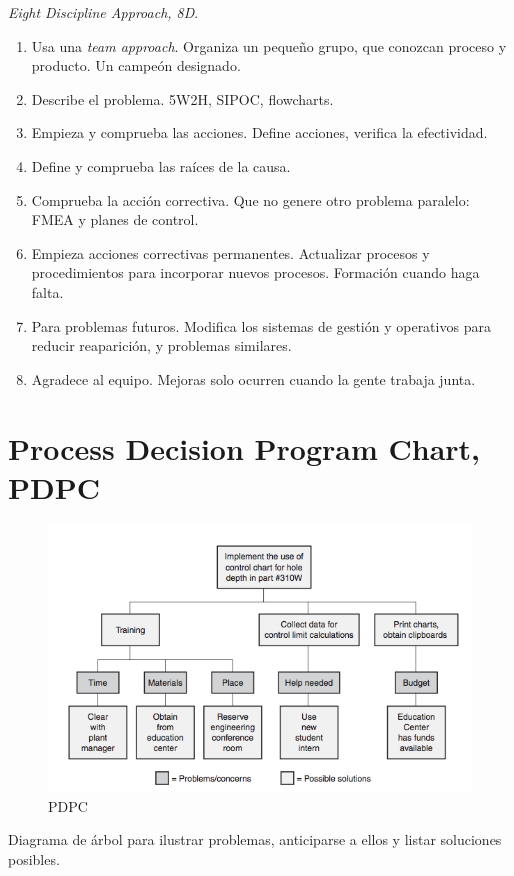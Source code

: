\documentclass[oneside]{book}
\begin{document}
\textit{Eight Discipline Approach, 8D}. 

\begin{enumerate}
	\item Usa una \textit{team approach}. Organiza un pequeño grupo, que conozcan proceso y producto. Un campeón designado.
	\item Describe el problema. 5W2H, SIPOC, flowcharts.
	\item Empieza y comprueba las acciones. Define acciones, verifica la efectividad.
	\item Define y comprueba las raíces de la causa. 
	\item Comprueba la acción correctiva. Que no genere otro problema paralelo: FMEA y planes de control.
	\item Empieza acciones correctivas permanentes. Actualizar procesos y procedimientos para incorporar nuevos procesos. Formación cuando haga falta.
	\item Para problemas futuros. Modifica los sistemas de gestión y operativos para reducir reaparición, y problemas similares.
	\item Agradece al equipo. Mejoras solo ocurren cuando la gente trabaja junta.
\end{enumerate}

\section{Process Decision Program Chart, PDPC}

\begin{figure}[ht!]
	\centering
	\includegraphics[width=120mm]{imagenes/PDPC.png}
	\caption{PDPC}
	\label{fig:PDPC}
\end{figure}

Diagrama de árbol para ilustrar problemas, anticiparse a ellos y listar soluciones posibles.
\end{document}
